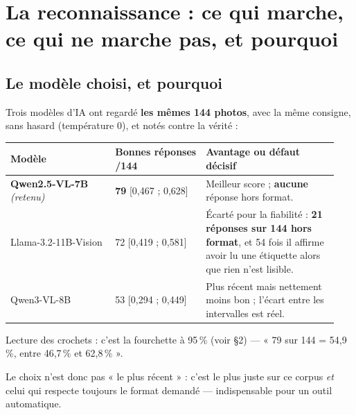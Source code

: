 \documentclass[10pt,a4paper]{article}
\begin{document}
\section{La reconnaissance : ce qui marche, ce qui ne marche pas, et pourquoi}
\subsection{Le modèle choisi, et pourquoi}
Trois modèles d'IA ont regardé \textbf{les mêmes 144 photos}, avec la même consigne, sans hasard
(température 0), et notés contre la vérité :
\begin{center}
\footnotesize\sffamily
\begin{tabular}{@{}p{0.30\linewidth}p{0.26\linewidth}p{0.38\linewidth}@{}}
\toprule
\textbf{Modèle} & \textbf{Bonnes réponses /144} & \textbf{Avantage ou défaut décisif}\\
\midrule
\textbf{Qwen2.5-VL-7B} \emph{(retenu)} & \textbf{79} [0,467 ; 0,628] & Meilleur score ; \textbf{aucune} réponse hors format.\\
Llama-3.2-11B-Vision & 72 [0,419 ; 0,581] & Écarté pour la fiabilité : \textbf{21 réponses sur 144 hors format}, et 54 fois il affirme avoir lu une étiquette alors que rien n'est lisible.\\
Qwen3-VL-8B & 53 [0,294 ; 0,449] & Plus récent mais nettement moins bon ; l'écart entre les intervalles est réel.\\
\bottomrule
\end{tabular}

{\scriptsize\sffamily Lecture des crochets : c'est la fourchette à 95\,\% (voir §2) — « 79 sur
144 = 54,9\,\%, entre 46,7\,\% et 62,8\,\% ».}
\end{center}
Le choix n'est donc pas « le plus récent » : c'est le plus juste sur ce corpus \emph{et} celui qui
respecte toujours le format demandé — indispensable pour un outil automatique.
\end{document}

